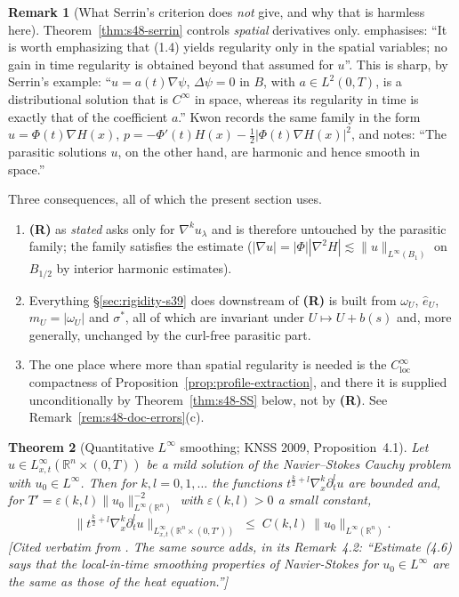 \documentclass[11pt]{article}
\newtheorem{theorem}{Theorem}[section]
\theoremstyle{definition}
\newtheorem{remark}[theorem]{Remark}
\theoremstyle{remark}
\newcommand{\R}{\mathbb{R}}
\begin{document}
\begin{remark}[What Serrin's criterion does \emph{not} give, and why that is
  harmless here]\label{rem:s48-time}
  Theorem~\ref{thm:s48-serrin} controls \emph{spatial} derivatives only.
  \cite{ChenGaldiPoggiSchikorra2026} emphasises: ``It is worth emphasizing
  that (1.4) yields regularity only in the spatial variables; no gain in time
  regularity is obtained beyond that assumed for $u$''. This is sharp, by
  Serrin's example: ``$u=a(t)\nabla\psi$, $\Delta\psi=0$ in $B$, with
  $a\in L^2(0,T)$, is a distributional solution that is $C^\infty$ in space,
  whereas its regularity in time is exactly that of the coefficient $a$.''
  Kwon \cite{Kwon2021} records the same family in the form
  $u=\Phi(t)\nabla H(x)$, $p=-\Phi'(t)H(x)-\tfrac12|\Phi(t)\nabla H(x)|^2$,
  and notes: ``The parasitic solutions $u$, on the other hand, are harmonic
  and hence smooth in space.''

  Three consequences, all of which the present section uses.
  \begin{enumerate}[label=(\roman*),leftmargin=2.2em]
  \item \textbf{(R)} as \emph{stated} asks only for $\nabla^k u_\lambda$ and
    is therefore untouched by the parasitic family; the family satisfies the
    estimate ($|\nabla u|=|\Phi||\nabla^2H|\lesssim
    \|u\|_{L^\infty(B_1)}$ on $B_{1/2}$ by interior harmonic estimates).
  \item Everything \S\ref{sec:rigidity-s39} does downstream of \textbf{(R)}
    is built from $\omega_U$, $\hat e_U$, $m_U=|\omega_U|$ and $\sigma^*$,
    all of which are invariant under $U\mapsto U+b(s)$ and, more generally,
    unchanged by the curl-free parasitic part.
  \item The one place where more than spatial regularity is needed is the
    $C^\infty_{\mathrm{loc}}$ compactness of
    Proposition~\ref{prop:profile-extraction}, and there it is supplied
    unconditionally by Theorem~\ref{thm:s48-SS} below, not by \textbf{(R)}.
    See Remark~\ref{rem:s48-doc-errors}(c).
  \end{enumerate}
\end{remark}

\begin{theorem}[Quantitative $L^\infty$ smoothing; KNSS 2009,
  Proposition~4.1]\label{thm:s48-knss41}
  Let $u\in L^\infty_{x,t}(\R^n\times(0,T))$ be a mild solution of the
  Navier--Stokes Cauchy problem with $u_0\in L^\infty$. Then for
  $k,l=0,1,\dots$ the functions $t^{\frac{k}{2}+l}\nabla_x^k\partial_t^lu$ are
  bounded and, for $T'=\varepsilon(k,l)\|u_0\|_{L^\infty(\R^n)}^{-2}$ with
  $\varepsilon(k,l)>0$ a small constant,
  \begin{equation}\label{eq:s48-knss41}
    \bigl\|t^{\frac{k}{2}+l}\nabla_x^k\partial_t^lu\bigr\|
      _{L^\infty_{x,t}(\R^n\times(0,T'))}
    \;\leq\; C(k,l)\,\|u_0\|_{L^\infty(\R^n)} .
  \end{equation}
  \emph{[Cited verbatim from \cite[Prop.~4.1 and (4.6)]{KNSS2009}. The same
  source adds, in its Remark~4.2: ``Estimate (4.6) says that the
  local-in-time smoothing properties of Navier-Stokes for $u_0\in L^\infty$
  are the same as those of the heat equation.'']}
\end{theorem}
\end{document}

